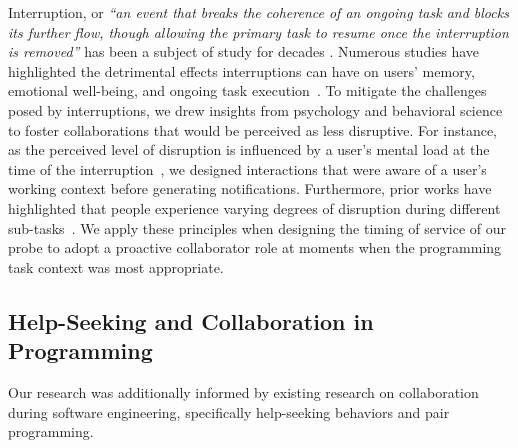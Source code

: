 Interruption, or \textit{``an event that breaks the coherence of an ongoing task and blocks its further flow, though allowing the primary task to resume once the interruption is removed''} has been a subject of study for decades \cite{mcfarlane2002scope}. 
Numerous studies have highlighted the detrimental effects interruptions can have on users' memory, emotional well-being, and ongoing task execution~\cite{bailey2000measuring,horvitz2001notification,czerwinski2000instant}. 
To mitigate the challenges posed by interruptions, we drew insights from psychology and behavioral science to foster collaborations that would be perceived as less disruptive.
For instance, as the perceived level of disruption is influenced by a user's mental load at the time of the interruption~\cite{czerwinski2000instant,bailey2000measuring,bailey2001effects}, we designed interactions that were aware of a user's working context before generating notifications.
Furthermore, prior works have highlighted that people experience varying degrees of disruption during different sub-tasks~\cite{horvitz2001notification,czerwinski2000instant, Miyata1986, iqbal2005towards}. 
We apply these principles when designing the timing of service of our probe to adopt a proactive collaborator role at moments when the programming task context was most appropriate.


\subsection{Help-Seeking and Collaboration in Programming}
Our research was additionally informed by existing research on collaboration during software engineering, specifically help-seeking behaviors and pair programming.

